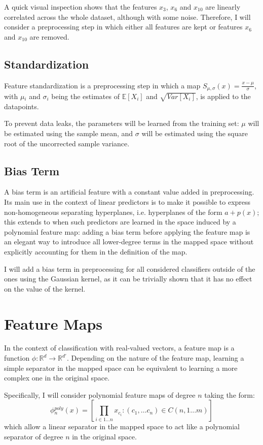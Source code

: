 A quick visual inspection shows that the features $x_3$, $x_6$ and $x_10$ are linearly correlated across the whole dataset, although with some noise. Therefore, I will consider a preprocessing step in which either all features are kept or features $x_6$ and $x_10$ are removed.

\subsection{Standardization}
Feature standardization is a preprocessing step in which a map $S_{\mu{}, \sigma{}}(x) = \frac{x - \mu{}}{\sigma{}}$, with $\mu{}_i$ and $\sigma{}_i$ being the estimates of $\mathbb{E}[X_i]$ and $\sqrt{Var[X_i]}$, is applied to the datapoints.

To prevent data leaks, the parameters will be learned from the training set: $\mu{}$ will be estimated using the sample mean, and $\sigma{}$ will be estimated using the square root of the uncorrected sample variance.

\subsection{Bias Term}
A bias term is an artificial feature with a constant value added in preprocessing. Its main use in the context of linear predictors is to make it possible to express non-homogeneous separating hyperplanes, i.e. hyperplanes of the form $a + p(x)$; this extends to when such predictors are learned in the space induced by a polynomial feature map: adding a bias term before applying the feature map is an elegant way to introduce all lower-degree terms in the mapped space without explicitly accounting for them in the definition of the map.

I will add a bias term in preprocessing for all considered classifiers outside of the ones using the Gaussian kernel, as it can be trivially shown that it has no effect on the value of the kernel.

\section{Feature Maps}
In the context of classification with real-valued vectors, a feature map is a function $\phi{}: \mathbb{R}^d \to{} \mathbb{R}^{d'}$. Depending on the nature of the feature map, learning a simple separator in the mapped space can be equivalent to learning a more complex one in the original space.

Specifically, I will consider polynomial feature maps of degree $n$ taking the form: \[ 
\phi{}^{poly}_n(x) = [\prod_{i \in 1 \dots{} n}{x_{c_i}} : (c_1, \dots c_n) \in{} C(n, 1...m) ] 
\] which allow a linear separator in the mapped space to act like a polynomial separator of degree $n$ in the original space. 

